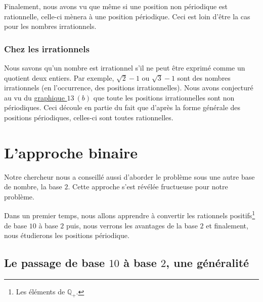 \documentclass[a4paper,french,12pt]{article}
\begin{document}
Finalement, nous avons vu que même si une position non périodique est rationnelle, celle-ci mènera à une position périodique. Ceci est loin d'être la cas pour les nombres irrationnels.
\subsubsection{Chez les irrationnels}
Nous savons qu'un nombre est irrationnel s'il ne peut être exprimé comme un quotient deux entiers. Par exemple, $\sqrt{2}-1$ ou $\sqrt{3}-1$ sont des nombres irrationnels (en l'occurrence, des positions irrationnelles). Nous avons conjecturé au vu du \hyperlink{4}{graphique $13\ (b)$} que toute les positions irrationnelles sont non périodiques. Ceci découle en partie du fait que d'après la forme générale des positions périodiques, celles-ci sont toutes rationnelles.



\section{L'approche binaire}
Notre chercheur nous a conseillé aussi d'aborder le problème sous une autre base de nombre, la base $2$. Cette approche s'est révélée fructueuse pour notre problème.

Dans un premier temps, nous allons apprendre à convertir les rationnels positifs\footnote{Les éléments de $\mathbb{Q}_+$.} de base $10$ à base $2$ puis, nous verrons les avantages de la base $2$ et finalement, nous étudierons les positions périodique.
\subsection{Le passage de base $10$ à base $2$, une généralité}
\end{document}

